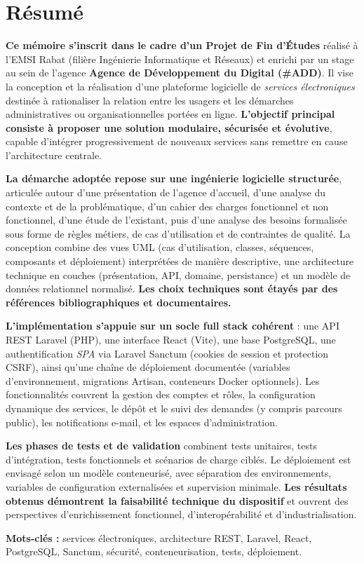 \chapter*{Résumé}
{}

\textbf{Ce mémoire s'inscrit dans le cadre d'un Projet de Fin d'Études} réalisé à l'EMSI Rabat (filière Ingénierie Informatique et Réseaux) et enrichi par un stage au sein de l'agence \textbf{Agence de Développement du Digital (\#ADD)}. Il vise la conception et la réalisation d'une plateforme logicielle de \emph{services électroniques} destinée à rationaliser la relation entre les usagers et les démarches administratives ou organisationnelles portées en ligne. \textbf{L'objectif principal consiste à proposer une solution modulaire, sécurisée et évolutive}, capable d'intégrer progressivement de nouveaux services sans remettre en cause l'architecture centrale.

\textbf{La démarche adoptée repose sur une ingénierie logicielle structurée}, articulée autour d'une présentation de l'agence d'accueil, d'une analyse du contexte et de la problématique, d'un cahier des charges fonctionnel et non fonctionnel, d'une étude de l'existant, puis d'une analyse des besoins formalisée sous forme de règles métiers, de cas d'utilisation et de contraintes de qualité. La conception combine des vues UML (cas d'utilisation, classes, séquences, composants et déploiement) interprétées de manière descriptive, une architecture technique en couches (présentation, API, domaine, persistance) et un modèle de données relationnel normalisé. \textbf{Les choix techniques sont étayés par des références bibliographiques et documentaires.}

\textbf{L'implémentation s'appuie sur un socle full stack cohérent} : une API REST Laravel (PHP), une interface React (Vite), une base PostgreSQL, une authentification \emph{SPA} via Laravel Sanctum (cookies de session et protection CSRF), ainsi qu'une chaîne de déploiement documentée (variables d'environnement, migrations Artisan, conteneurs Docker optionnels). Les fonctionnalités couvrent la gestion des comptes et rôles, la configuration dynamique des services, le dépôt et le suivi des demandes (y compris parcours public), les notifications e-mail, et les espaces d'administration.

\textbf{Les phases de tests et de validation} combinent tests unitaires, tests d'intégration, tests fonctionnels et scénarios de charge ciblés. Le déploiement est envisagé selon un modèle conteneurisé, avec séparation des environnements, variables de configuration externalisées et supervision minimale. \textbf{Les résultats obtenus démontrent la faisabilité technique du dispositif} et ouvrent des perspectives d'enrichissement fonctionnel, d'interopérabilité et d'industrialisation.

\vspace{0.8cm}
\noindent\textbf{Mots-clés :} services électroniques, architecture REST, Laravel, React, PostgreSQL, Sanctum, sécurité, conteneurisation, tests, déploiement.

\cleardoublepage